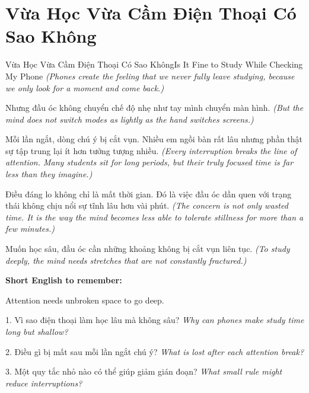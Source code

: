 \section{Vừa Học Vừa Cầm Điện Thoại Có Sao Không}
\begin{truyen}{Vừa Học Vừa Cầm Điện Thoại Có Sao Không}{Is It Fine to Study While Checking My Phone}
\textit{(Phones create the feeling that we never fully leave studying, because we only look for a moment and come back.)}

Nhưng đầu óc không chuyển chế độ nhẹ như tay mình chuyển màn hình.
\textit{(But the mind does not switch modes as lightly as the hand switches screens.)}

Mỗi lần ngắt, dòng chú ý bị cắt vụn. Nhiều em ngồi bàn rất lâu nhưng phần thật sự tập trung lại ít hơn tưởng tượng nhiều.
\textit{(Every interruption breaks the line of attention. Many students sit for long periods, but their truly focused time is far less than they imagine.)}

Điều đáng lo không chỉ là mất thời gian. Đó là việc đầu óc dần quen với trạng thái không chịu nổi sự tĩnh lâu hơn vài phút.
\textit{(The concern is not only wasted time. It is the way the mind becomes less able to tolerate stillness for more than a few minutes.)}
\end{truyen}

\begin{baihoc}
Muốn học sâu, đầu óc cần những khoảng không bị cắt vụn liên tục.
\textit{(To study deeply, the mind needs stretches that are not constantly fractured.)}
\end{baihoc}

\begin{ghinhoanh}
\textbf{Short English to remember:}

Attention needs unbroken space to go deep.

\end{ghinhoanh}

\begin{tuhocnhanh}
1. Vì sao điện thoại làm học lâu mà không sâu? \textit{Why can phones make study time long but shallow?}

2. Điều gì bị mất sau mỗi lần ngắt chú ý? \textit{What is lost after each attention break?}

3. Một quy tắc nhỏ nào có thể giúp giảm gián đoạn? \textit{What small rule might reduce interruptions?}
\end{tuhocnhanh}
\ngancach

